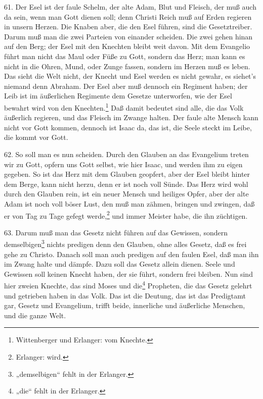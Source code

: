 61. Der Esel ist der faule Schelm, der alte Adam, Blut und Fleisch, der muß auch da sein, wenn man Gott dienen soll; denn Christi Reich muß auf Erden regieren in unsern Herzen. Die Knaben aber, die den Esel führen, sind die Gesetztreiber. Darum muß man die zwei Parteien von einander scheiden. Die zwei gehen hinan auf den Berg; der Esel mit den Knechten bleibt weit davon. Mit dem Evangelio führt man nicht das Maul oder Füße zu Gott, sondern das Herz; man kann es nicht in die Ohren, Mund, oder Zunge fassen, sondern im Herzen muß es leben. Das sieht die Welt nicht, der Knecht und Esel werden es nicht gewahr, es siehet's niemand denn Abraham. Der Esel aber muß dennoch ein Regiment haben; der Leib ist im äußerlichen Regimente dem Gesetze unterworfen, wie der Esel bewahrt wird von den Knechten.\footnote{Wittenberger und Erlanger: vom Knechte.} Daß damit bedeutet sind alle, die das Volk äußerlich regieren, und das Fleisch im Zwange halten. Der faule alte Mensch kann nicht vor Gott kommen, dennoch ist Isaac da, das ist, die Seele steckt im Leibe, die kommt vor Gott.

62. So soll man es nun scheiden. Durch den Glauben an das Evangelium treten wir zu Gott, opfern uns Gott selbst, wie hier Isaac, und werden ihm zu eigen gegeben. So ist das Herz mit dem Glauben geopfert, aber der Esel bleibt hinter dem Berge, kann nicht herzu, denn er ist noch voll Sünde. Das Herz wird wohl durch den Glauben rein, ist ein neuer Mensch und heiliges Opfer, aber der alte Adam ist noch voll böser Lust, den muß man zähmen, bringen und zwingen, daß er von Tag zu Tage gefegt werde,\footnote{Erlanger: wird.} und immer Meister habe, die ihn züchtigen.

63. Darum muß man das Gesetz nicht führen auf das Gewissen, sondern demselbigen\footnote{„demselbigen“ fehlt in der Erlanger.} nichts predigen denn den Glauben, ohne alles Gesetz, daß es frei gehe zu Christo. Danach soll man auch predigen auf den faulen Esel, daß man ihn im Zwang halte und dämpfe. Dazu soll das Gesetz allein dienen. Seele und Gewissen soll keinen Knecht haben, der sie führt, sondern frei bleiben. Nun sind hier zweien Knechte, das sind Moses und die\footnote{„die“ fehlt in der Erlanger.} Propheten, die das Gesetz gelehrt und getrieben haben in das Volk. Das ist die Deutung, das ist das Predigtamt gar, Gesetz und Evangelium, trifft beide, innerliche und äußerliche Menschen, und die ganze Welt.

